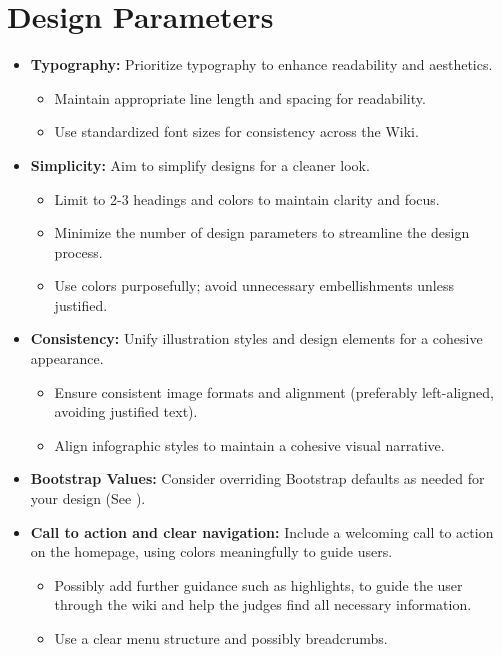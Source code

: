     \section{Design Parameters }
    \begin{itemize}
        \item \textbf{Typography:} Prioritize typography to enhance readability and aesthetics.
        \begin{itemize}
            \item Maintain appropriate line length and spacing for readability.
            \item Use standardized font sizes for consistency across the Wiki.
        \end{itemize}
        \item \textbf{Simplicity:} Aim to simplify designs for a cleaner look.
        \begin{itemize}
            \item Limit to 2-3 headings and colors to maintain clarity and focus.
            \item Minimize the number of design parameters to streamline the design process.
            \item Use colors purposefully; avoid unnecessary embellishments unless justified.
        \end{itemize}
        \item \textbf{Consistency:} Unify illustration styles and design elements for a cohesive appearance.
        \begin{itemize}
            \item Ensure consistent image formats and alignment (preferably left-aligned, avoiding justified text).
            \item Align infographic styles to maintain a cohesive visual narrative.
        \end{itemize}
        \item \textbf{Bootstrap Values:} Consider overriding Bootstrap defaults as needed for your design (See ).
        \item \textbf{Call to action and clear navigation:} Include a welcoming call to action on the homepage, using colors meaningfully to guide users.
        \begin{itemize}
            \item Possibly add further guidance such as highlights, to guide the user through the wiki and help the judges find all necessary information.
            \item Use a clear menu structure and possibly breadcrumbs.

\end{itemize}
\end{itemize}
